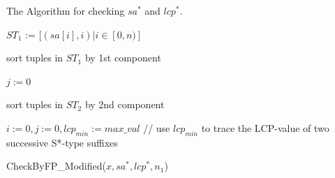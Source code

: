 \documentclass[10pt,journal,compsoc]{IEEEtran}
\begin{document}
\begin{algorithm*}
	
	\caption{The Algorithm for checking $sa^*$ and $lcp^*$.}
	
	\label{alg:2}
	
	
	
	$ST_1$ := $[(sa[i], i) | i \in [0, n)]$ \label{alg:2:a}
		
	sort tuples in $ST_1$ by 1st component \label{alg:2:b}
	
	$j := 0$
	
	\For{$i \in (n, 0]$}{
	
		$e := ST_1.{\sf top}()$, $ST_1.{\sf pop}()$
		
		\If{$x[i]$ is S*-type}{
			
			$e.1st := j$, $j := j + 1$, $ST_2.{\sf push}(e)$
		}
	}

	sort tuples in $ST_2$ by 2nd component
	
	$i := 0, j := 0, lcp_{min} := max\_val$ \hspace{1cm} // use $lcp_{min}$ to trace the LCP-value of two successive S*-type suffixes
	
	
	CheckByFP\_Modified($x, sa^*, lcp^*, n_1$)
	
\end{algorithm*}
\end{document}
